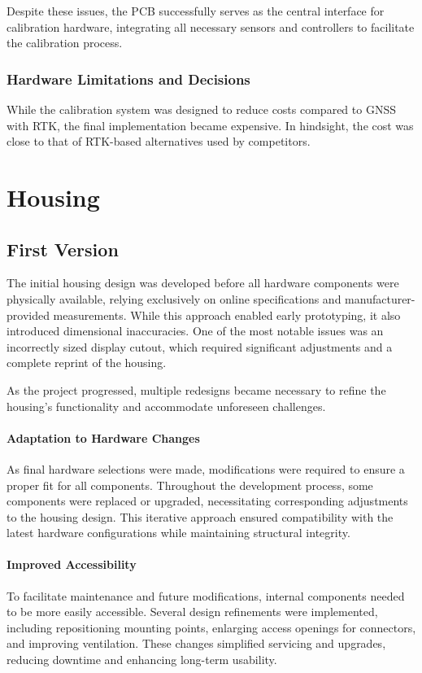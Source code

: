 Despite these issues, the PCB successfully serves as the central interface for calibration hardware, integrating all necessary sensors and controllers to facilitate the calibration process.

\subsubsection*{Hardware Limitations and Decisions}
While the calibration system was designed to reduce costs compared to GNSS with RTK, the final implementation became expensive. In hindsight, the cost was close to that of RTK-based alternatives used by competitors.

\section{Housing}
\subsection{First Version}  

The initial housing design was developed before all hardware components were physically available, relying exclusively on online specifications and manufacturer-provided measurements. While this approach enabled early prototyping, it also introduced dimensional inaccuracies. One of the most notable issues was an incorrectly sized display cutout, which required significant adjustments and a complete reprint of the housing.  

As the project progressed, multiple redesigns became necessary to refine the housing’s functionality and accommodate unforeseen challenges.

\paragraph{Adaptation to Hardware Changes}  
As final hardware selections were made, modifications were required to ensure a proper fit for all components. Throughout the development process, some components were replaced or upgraded, necessitating corresponding adjustments to the housing design. This iterative approach ensured compatibility with the latest hardware configurations while maintaining structural integrity.  

\paragraph{Improved Accessibility}  
To facilitate maintenance and future modifications, internal components needed to be more easily accessible. Several design refinements were implemented, including repositioning mounting points, enlarging access openings for connectors, and improving ventilation. These changes simplified servicing and upgrades, reducing downtime and enhancing long-term usability.  

